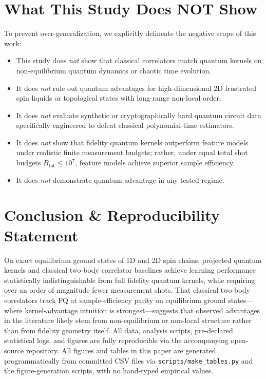 \documentclass[conference]{IEEEtran}
\begin{document}
\section{What This Study Does NOT Show}
To prevent over-generalization, we explicitly delineate the negative scope of this work:
\begin{itemize}
    \item This study does \textit{not} show that classical correlators match quantum kernels on non-equilibrium quantum dynamics or chaotic time evolution.
    \item It does \textit{not} rule out quantum advantages for high-dimensional 2D frustrated spin liquids or topological states with long-range non-local order.
    \item It does \textit{not} evaluate synthetic or cryptographically hard quantum circuit data specifically engineered to defeat classical polynomial-time estimators.
    \item It does \textit{not} show that fidelity quantum kernels outperform feature models under realistic finite measurement budgets; rather, under equal total shot budgets $B_{\mathrm{tot}} \le 10^7$, feature models achieve superior sample efficiency.
    \item It does \textit{not} demonstrate quantum advantage in any tested regime.
\end{itemize}

\section{Conclusion \& Reproducibility Statement}
On exact equilibrium ground states of 1D and 2D spin chains, projected quantum kernels and classical two-body correlator baselines achieve learning performance statistically indistinguishable from full fidelity quantum kernels, while requiring over an order of magnitude fewer measurement shots. That classical two-body correlators track FQ at sample-efficiency parity on equilibrium ground states---where kernel-advantage intuition is strongest---suggests that observed advantages in the literature likely stem from non-equilibrium or non-local structure rather than from fidelity geometry itself. All data, analysis scripts, pre-declared statistical logs, and figures are fully reproducible via the accompanying open-source repository. All figures and tables in this paper are generated programmatically from committed CSV files via \texttt{scripts/make\_tables.py} and the figure-generation scripts, with no hand-typed empirical values.

\begingroup
\footnotesize


\endgroup
\end{document}
